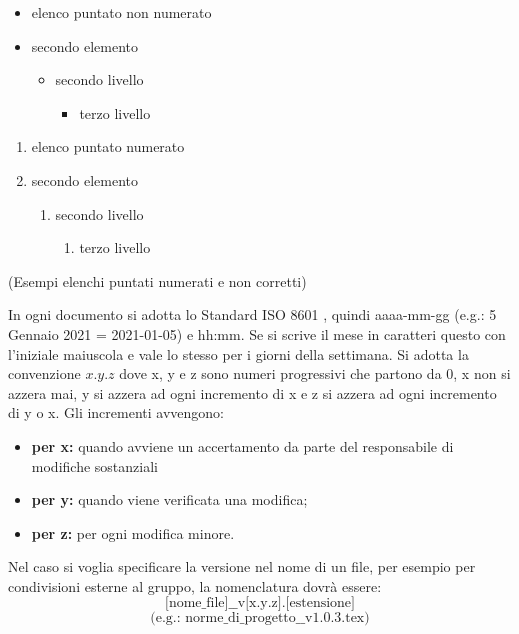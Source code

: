         \begin{multicols}{2}
            \begin{itemize}
                \item elenco puntato non numerato
                \item secondo elemento
                \begin{itemize}
                    \item secondo livello
                    \begin{itemize}
                        \item terzo livello
                    \end{itemize}
                \end{itemize}
            \end{itemize}
            \begin{enumerate}
                \item elenco puntato numerato
                \item secondo elemento
                \begin{enumerate}
                    \item secondo livello
                    \begin{enumerate}
                        \item terzo livello
                    \end{enumerate}
                \end{enumerate}
            \end{enumerate}
        \end{multicols}
        \centerline{(Esempi elenchi puntati numerati e non corretti)}
        In ogni documento si adotta lo Standard ISO 8601 , quindi aaaa-mm-gg (e.g.: 5 Gennaio 2021 = 2021-01-05) e hh:mm. Se si scrive il mese in caratteri questo con l'iniziale maiuscola e vale lo stesso per i giorni della settimana.
        \label{versions}
        Si adotta la convenzione $x.y.z$ dove x, y e z sono numeri progressivi che partono da 0, x non si azzera mai, y si azzera ad ogni incremento di x e z si azzera ad ogni incremento di y o x. Gli incrementi avvengono:
        \begin{itemize}
            \item \textbf{per x: }quando avviene un accertamento da parte del responsabile di modifiche sostanziali
            \item \textbf{per y: }quando viene verificata una modifica;
            \item \textbf{per z: }per ogni modifica minore.
        \end{itemize}
        Nel caso si voglia specificare la versione nel nome di un file, per esempio per condivisioni esterne al gruppo, la nomenclatura dovrà essere: $$\text{[nome\_file]\_\_v[x.y.z].[estensione]}$$ $$\text{(e.g.: norme\_di\_progetto\_\_v1.0.3.tex)}$$

